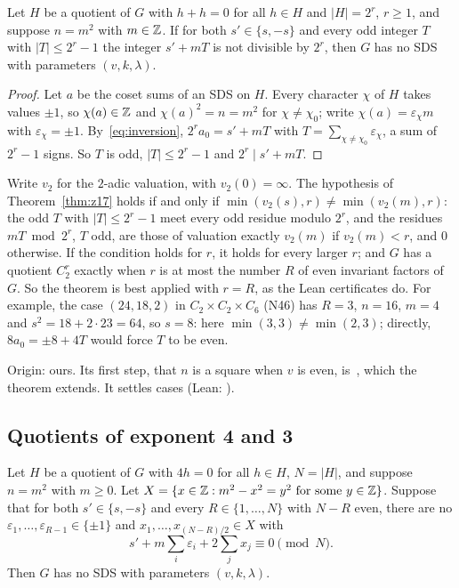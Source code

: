 \begin{theorem}\label{thm:z17}
Let $H$ be a quotient of $G$ with $h + h = 0$ for all $h \in H$ and $|H| = 2^r$, $r \ge 1$, and
suppose $n = m^2$ with $m \in \mathbb{Z}$. If for both $s' \in \{s,-s\}$ and every odd integer $T$ with
$|T| \le 2^r - 1$ the integer $s' + mT$ is not divisible by $2^r$, then $G$ has no SDS with
parameters $(v,k,\lambda)$.
\end{theorem}

\begin{proof}
Let $a$ be the coset sums of an SDS on $H$. Every character $\chi$ of $H$ takes values $\pm 1$, so
$\chi(a) \in \mathbb{Z}$ and $\chi(a)^2 = n = m^2$ for $\chi \ne \chi_0$; write $\chi(a) = \varepsilon_\chi m$
with $\varepsilon_\chi = \pm 1$. By~\eqref{eq:inversion},
$2^r a_0 = s' + mT$ with $T = \sum_{\chi \ne \chi_0} \varepsilon_\chi$, a sum of $2^r - 1$
signs. So $T$ is odd, $|T| \le 2^r - 1$ and $2^r \mid s' + mT$.
\end{proof}

\begin{remark}\label{rem:z17}
Write $v_2$ for the $2$-adic valuation, with $v_2(0) = \infty$. The hypothesis of
Theorem~\ref{thm:z17} holds if and only if $\min(v_2(s), r) \ne \min(v_2(m), r)$: the odd $T$
with $|T| \le 2^r - 1$ meet every odd residue modulo $2^r$, and the residues $mT \bmod 2^r$, $T$
odd, are those of valuation exactly $v_2(m)$ if $v_2(m) < r$, and $0$ otherwise. If the condition
holds for $r$, it holds for every larger $r$; and $G$ has a quotient $C_2^r$ exactly when $r$ is at
most the number $R$ of even invariant factors of $G$. So the theorem is best applied with $r = R$,
as the Lean certificates do. For example, the case $(24,18,2)$ in $C_2 \times C_2 \times C_6$
(N46) has $R = 3$, $n = 16$, $m = 4$ and $s^2 = 18 + 2 \cdot 23 = 64$, so $s = 8$: here
$\min(3,3) \ne \min(2,3)$; directly, $8 a_0 = \pm 8 + 4T$ would force $T$ to be even.

Origin: ours. Its first step, that $n$ is a square when $v$ is even, is~\cite[Thm.~4.2]{he-wu},
which the theorem extends. It settles  cases (Lean:
).
\end{remark}

\subsection{Quotients of exponent 4 and 3}

\begin{theorem}\label{thm:z18}
Let $H$ be a quotient of $G$ with $4h = 0$ for all $h \in H$, $N = |H|$, and suppose $n = m^2$
with $m \ge 0$. Let $X = \{x \in \mathbb{Z} : m^2 - x^2 = y^2 \text{ for some } y \in \mathbb{Z}\}$. Suppose that
for both $s' \in \{s, -s\}$ and every $R \in \{1, \dots, N\}$ with $N - R$ even, there are no
$\varepsilon_1, \dots, \varepsilon_{R-1} \in \{\pm 1\}$ and
$x_1, \dots, x_{(N-R)/2} \in X$ with
\[
  s' + m \sum_i \varepsilon_i + 2 \sum_j x_j \equiv 0 \pmod N .
\]
Then $G$ has no SDS with parameters $(v,k,\lambda)$.
\end{theorem}

